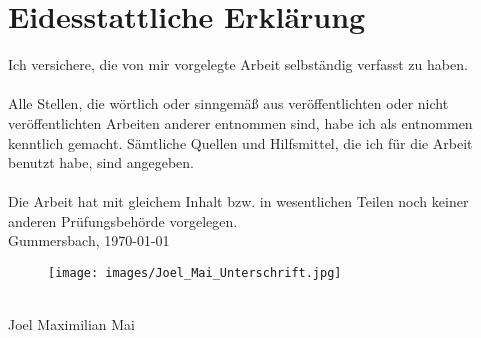 \chapter*{Eidesstattliche Erklärung}

Ich versichere, die von mir vorgelegte Arbeit selbständig verfasst zu haben.\\ \\
Alle Stellen, die wörtlich oder sinngemäß aus veröffentlichten oder nicht veröffentlichten Arbeiten anderer entnommen sind, habe ich als entnommen kenntlich gemacht. Sämtliche Quellen und Hilfsmittel, die ich für die Arbeit benutzt habe, sind angegeben.\\ \\
Die Arbeit hat mit gleichem Inhalt bzw. in wesentlichen Teilen noch keiner anderen Prüfungsbehörde vorgelegen.
\vspace{1.5cm}
\\
Gummersbach, \today
\vspace{1cm}
\\
\begin{figure}[!ht]
		\texttt{[image: images/Joel\_Mai\_Unterschrift.jpg]}
\end{figure}
\\
Joel Maximilian Mai
